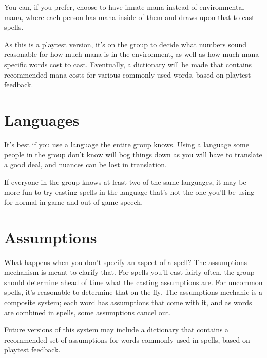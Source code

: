 \begin{rpg-suggestionbox}
	You can, if you prefer, choose to have innate mana instead of environmental mana, where each person has mana inside of them and draws upon that to cast spells.
\end{rpg-suggestionbox}

\begin{rpg-commentbox}
	As this is a playtest version, it's on the group to decide what numbers sound reasonable for how much mana is in the environment, as well as how much mana specific words cost to cast.
	Eventually, a dictionary will be made that contains recommended mana costs for various commonly used words, based on playtest feedback.
\end{rpg-commentbox}

\section{Languages}
It's best if you use a language the entire group knows.
Using a language some people in the group don't know will bog things down as you will have to translate a good deal, and nuances can be lost in translation.

\begin{rpg-suggestionbox}
	If everyone in the group knows at least two of the same languages, it may be more fun to try casting spells in the language that's not the one you'll be using for normal in-game and out-of-game speech.
\end{rpg-suggestionbox}

\section{Assumptions}
What happens when you don't specify an aspect of a spell?
The assumptions mechanism is meant to clarify that.
For spells you'll cast fairly often, the group should determine ahead of time what the casting assumptions are.
For uncommon spells, it's reasonable to determine that on the fly.
The assumptions mechanic is a composite system; each word has assumptions that come with it, and as words are combined in spells, some assumptions cancel out.

\begin{rpg-commentbox}
	Future versions of this system may include a dictionary that contains a recommended set of assumptions for words commonly used in spells, based on playtest feedback.
\end{rpg-commentbox}

